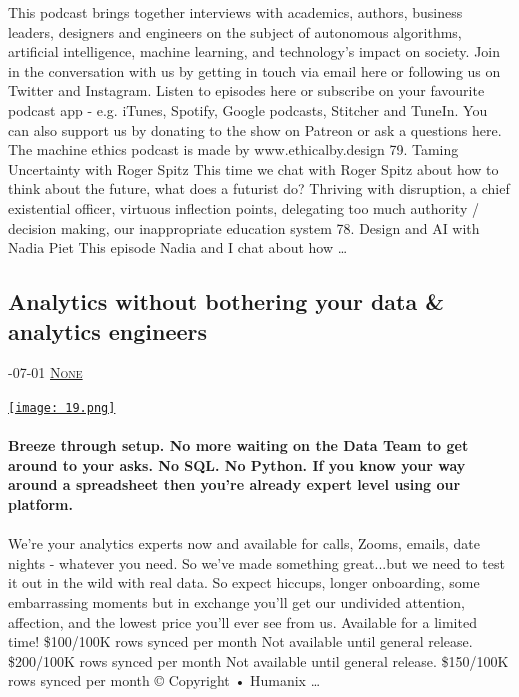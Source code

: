 \documentclass[10pt,a4paper]{article}
\begin{document}
\begin{multicols}{2}
This podcast brings together interviews with academics, authors, business leaders, designers and engineers on the subject of autonomous algorithms, artificial intelligence, machine learning, and technology's impact on society. Join in the conversation with us by getting in touch via email here or following us on Twitter and Instagram.
Listen to episodes here or subscribe on your favourite podcast app - e.g. iTunes, Spotify, Google podcasts, Stitcher and TuneIn. You can also support us by donating to the show on Patreon or ask a questions here.
The machine ethics podcast is made by www.ethicalby.design
79. Taming Uncertainty with Roger Spitz
This time we chat with Roger Spitz about how to think about the future, what does a futurist do? Thriving with disruption, a chief existential officer, virtuous inflection points, delegating too much authority / decision making, our inappropriate education system
78. Design and AI with Nadia Piet
This episode Nadia and I chat about how
\dots\par
\noindent\begin{minipage}{\linewidth}
\medskip
\subsection{Analytics without bothering your data \& analytics engineers}
\textsc{\footnotesize
{\scriptsize\faCalendar}-07-01 
{\scriptsize\faComments}\space 
\href{}{None} 
}
\par\medskip\noindent
\href{https://welcome.humanix.app/beta-launch/}{
    \texttt{[image: 19.png]}
}
\end{minipage}
\paragraph{}
\textbf{Breeze through setup. No more waiting on the Data Team to get around to your asks.
No SQL. No Python. If you know your way around a spreadsheet then you're already expert level using our platform.}
\paragraph{}

We're your analytics experts now and available for calls, Zooms, emails, date nights - whatever you need.
So we've made something great...but we need to test it out in the wild with real data. So expect hiccups, longer onboarding, some embarrassing moments but in exchange you'll get our undivided attention, affection, and the lowest price you'll ever see from us.
Available for a limited time!
\$100/100K rows synced per month
Not available until general release.
\$200/100K rows synced per month
Not available until general release.
\$150/100K rows synced per month
© Copyright • Humanix
\dots\par
\noindent\begin{minipage}{\linewidth}
\medskip

\end{minipage}
\end{multicols}
\end{document}
